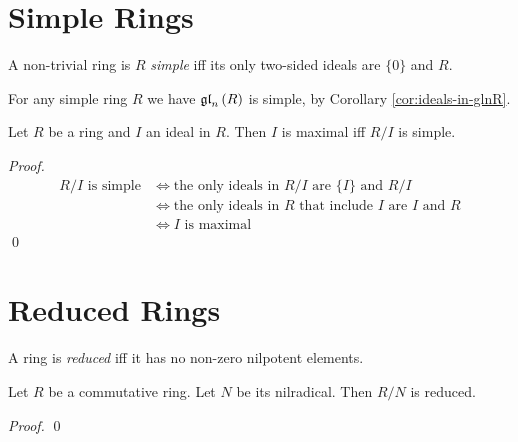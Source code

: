\chapter{Simple Rings}

\begin{df}
A non-trivial ring is $R$ \emph{simple} iff its only two-sided ideals are $\{0\}$ and $R$.
\end{df}

\begin{ex}
For any simple ring $R$ we have $\mathfrak{gl}_{n} \left( {R} \right)$ is simple, by Corollary \ref{cor:ideals-in-glnR}.
\end{ex}

\begin{prop}
\label{prop:maximal-iff-quotient-simple}
Let $R$ be a ring and $I$ an ideal in $R$. Then $I$ is maximal iff $R/I$ is simple.
\end{prop}

\begin{proof}
\pf
\begin{align*}
R / I \text{ is simple}
& \Leftrightarrow \text{the only ideals in } R / I \text{ are } \{I\} \text{ and } R / I \\
& \Leftrightarrow \text{the only ideals in } R \text{ that include } I \text{ are } I \text{ and } R \\
& \Leftrightarrow I \text{ is maximal}
\end{align*}
\qed
\end{proof}

\chapter{Reduced Rings}

\begin{df}
A ring is \emph{reduced} iff it has no non-zero nilpotent elements.
\end{df}

\begin{prop}
Let $R$ be a commutative ring. Let $N$ be its nilradical. Then $R/N$ is reduced.
\end{prop}

\begin{proof}
\pf
{}
\qed
\end{proof}


